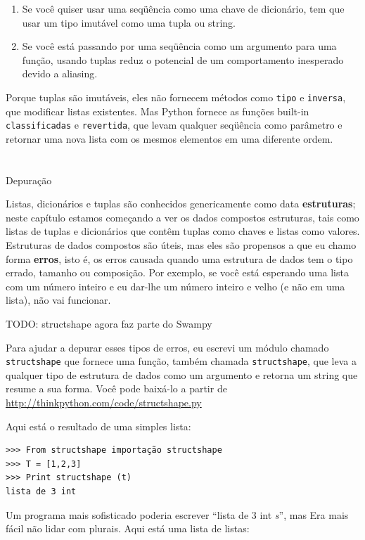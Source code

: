 \documentclass[10pt]{book}
\begin{document}
\begin{exercise}
\begin{v erbatim}
\begin{enumerate}
\item Se você quiser usar uma seqüência como uma chave de dicionário,
tem que usar um tipo imutável como uma tupla ou string.

\item Se você está passando por uma seqüência como um argumento para uma função,
usando tuplas reduz o potencial de um comportamento inesperado
devido a aliasing.

\end{enumerate}

Porque tuplas são imutáveis, eles não fornecem métodos
como {\tt tipo} e {\tt inversa}, que modificar listas existentes.
Mas Python fornece as funções built-in {\tt classificadas}
e {\tt revertida}, que levam qualquer seqüência como parâmetro
e retornar uma nova lista com os mesmos elementos em uma diferente
ordem.


\section{} Depuração

Listas, dicionários e tuplas são conhecidos genericamente como {data \bf
  estruturas}; neste capítulo estamos começando a ver os dados compostos
estruturas, tais como listas de tuplas e dicionários que contêm tuplas
como chaves e listas como valores. Estruturas de dados compostos são úteis, mas
eles são propensos a que eu chamo {forma \bf erros}, isto é, os erros
causada quando uma estrutura de dados tem o tipo errado, tamanho ou composição.
Por exemplo, se você está esperando uma lista com um número inteiro e eu
dar-lhe um número inteiro e velho (e não em uma lista), não vai funcionar.

TODO: structshape agora faz parte do Swampy

Para ajudar a depurar esses tipos de erros, eu escrevi um módulo
chamado {\tt structshape} que fornece uma função, também chamada
{\tt structshape}, que leva a qualquer tipo de estrutura de dados como
um argumento e retorna um string que resume a sua forma.
Você pode baixá-lo a partir de \url{http://thinkpython.com/code/structshape.py}

Aqui está o resultado de uma simples lista:

\begin{verbatim}
>>> From structshape importação structshape
>>> T = [1,2,3]
>>> Print structshape (t)
lista de 3 int
\end{verbatim}
%
Um programa mais sofisticado poderia escrever ``lista de 3 int {\em s}'', mas
Era mais fácil não lidar com plurais. Aqui está uma lista de listas:


\end{v erbatim}
\end{exercise}
\end{document}
